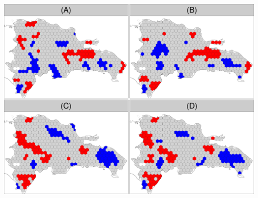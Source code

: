 \documentclass[10pt,landscape,a3paper]{article}
\begin{document}
\begin{center}\includegraphics{img/modelling/lta-esda-14} \end{center}
\end{document}

